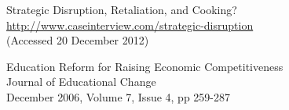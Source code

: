 \documentclass[a4paper,10pt]{book}
\begin{document}
\begin{thebibliography}{9}
Strategic Disruption, Retaliation, and Cooking? \\
\url{http://www.caseinterview.com/strategic-disruption}\\
(Accessed 20 December 2012)

Education Reform for Raising Economic Competitiveness\\
Journal of Educational Change\\
December 2006, Volume 7, Issue 4, pp 259-287\\

\end{thebibliography}
\end{document}
